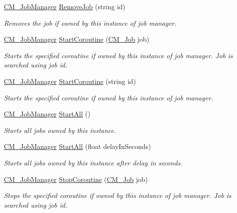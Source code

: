 \begin{DoxyCompactItemize}
\hyperlink{class_c_m___job_manager}{C\+M\+\_\+\+Job\+Manager} \hyperlink{class_c_m___job_manager_afc719b10d34b02fa82c26bbfbadc7356}{Remove\+Job} (string id)
\begin{DoxyCompactList}\small\item\em Removes the job if owned by this instance of job manager. \end{DoxyCompactList}\item 
\hyperlink{class_c_m___job_manager}{C\+M\+\_\+\+Job\+Manager} \hyperlink{class_c_m___job_manager_a81deb518cf6f4359330e6f0d405080ef}{Start\+Coroutine} (\hyperlink{class_c_m___job}{C\+M\+\_\+\+Job} job)
\begin{DoxyCompactList}\small\item\em Starts the specified coroutine if owned by this instance of job manager. Job is searched using job id. \end{DoxyCompactList}\item 
\hyperlink{class_c_m___job_manager}{C\+M\+\_\+\+Job\+Manager} \hyperlink{class_c_m___job_manager_af2bb3415fd6f85c1e04f99b2cc6efd4e}{Start\+Coroutine} (string id)
\begin{DoxyCompactList}\small\item\em Starts the specified coroutine if owned by this instance of job manager. \end{DoxyCompactList}\item 
\hyperlink{class_c_m___job_manager}{C\+M\+\_\+\+Job\+Manager} \hyperlink{class_c_m___job_manager_aeee478b4e96e09cb9f4a7e3610c7dd49}{Start\+All} ()
\begin{DoxyCompactList}\small\item\em Starts all jobs owned by this instance. \end{DoxyCompactList}\item 
\hyperlink{class_c_m___job_manager}{C\+M\+\_\+\+Job\+Manager} \hyperlink{class_c_m___job_manager_acf6ad4a995461c0bc6f519150e57306c}{Start\+All} (float delay\+In\+Seconds)
\begin{DoxyCompactList}\small\item\em Starts all jobs owned by this instance after delay in seconds. \end{DoxyCompactList}\item 
\hyperlink{class_c_m___job_manager}{C\+M\+\_\+\+Job\+Manager} \hyperlink{class_c_m___job_manager_adf2ecaac62cbb5f946c6644dc03bc69c}{Stop\+Coroutine} (\hyperlink{class_c_m___job}{C\+M\+\_\+\+Job} job)
\begin{DoxyCompactList}\small\item\em Stops the specified coroutine if owned by this instance of job manager. Job is searched using job id. \end{DoxyCompactList}\item 

\end{DoxyCompactItemize}
